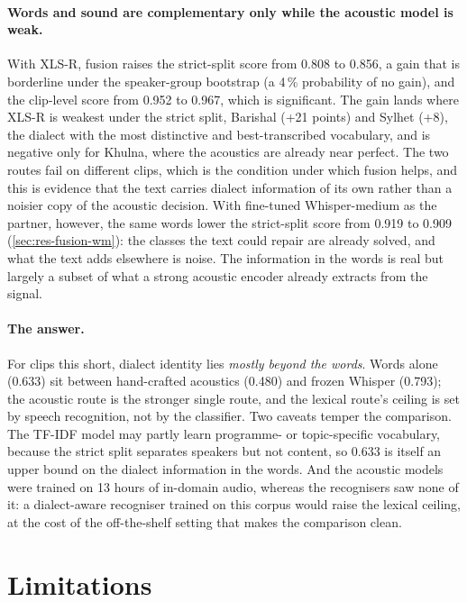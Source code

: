 \paragraph{Words and sound are complementary only while the acoustic model
is weak.} With XLS-R, fusion raises the strict-split score from 0.808 to
0.856, a gain that is borderline under the speaker-group bootstrap (a 4\,\%
probability of no gain), and the clip-level score from 0.952 to 0.967, which
is significant. The gain lands where XLS-R is weakest under the strict
split, Barishal (+21 points) and Sylhet (+8), the dialect with the most
distinctive and best-transcribed vocabulary, and is negative only for
Khulna, where the acoustics are already near perfect. The two routes fail on
different clips, which is the condition under which fusion helps, and this is
evidence that the text carries dialect information of its own rather than a
noisier copy of the acoustic decision. With fine-tuned Whisper-medium as the
partner, however, the same words lower the strict-split score from 0.919 to
0.909 (\cref{sec:res-fusion-wm}): the classes the text could repair are
already solved, and what the text adds elsewhere is noise. The information in
the words is real but largely a subset of what a strong acoustic encoder
already extracts from the signal.

\paragraph{The answer.} For clips this short, dialect identity lies
\emph{mostly beyond the words}. Words alone (0.633) sit between hand-crafted
acoustics (0.480) and frozen Whisper (0.793); the acoustic route is the stronger
single route, and the lexical route's ceiling is set by speech recognition, not
by the classifier. Two caveats temper the comparison. The TF-IDF model may
partly learn programme- or topic-specific vocabulary, because the strict split
separates speakers but not content, so 0.633 is itself an upper bound on the
dialect information in the words. And the acoustic models were trained on 13
hours of in-domain audio, whereas the recognisers saw none of it: a
dialect-aware recogniser trained on this corpus would raise the lexical ceiling,
at the cost of the off-the-shelf setting that makes the comparison clean.

\section{Limitations}
\label{sec:disc-limits}

